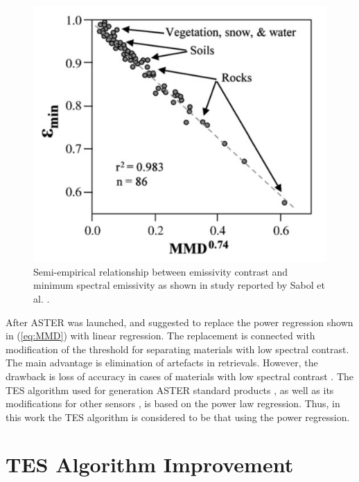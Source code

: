 \begin{figure}[thb]
	\centering
	\includegraphics[scale=0.2]{pics/Chapter_03/EpsMinMMD.png}
	\vspace{1.5 em}
	\caption{Semi-empirical relationship between emissivity contrast and minimum spectral emissivity as shown in study reported by Sabol et al. \cite{SG09}.}
	\label{fig:EpsMinMMD}
\end{figure}

After ASTER was launched, \cite{GG06} and \cite{SG09} suggested to replace the power regression shown in (\ref{eq:MMD}) with linear regression. The replacement is connected with modification of the threshold for separating materials with low spectral contrast. The main advantage is elimination of artefacts in retrievals. However, the drawback is loss of accuracy in cases of materials with low spectral contrast \cite{SG09}. The TES algorithm used for generation ASTER standard products \cite{B15}, as well as its modifications for other sensors \cite{SJ06, JS12, WX11, SJ02, JS14, HH11, MB02, HH11-2}, is based on the power law regression. Thus, in this work the TES algorithm is considered to be that using the power regression.

\section{TES Algorithm Improvement}

